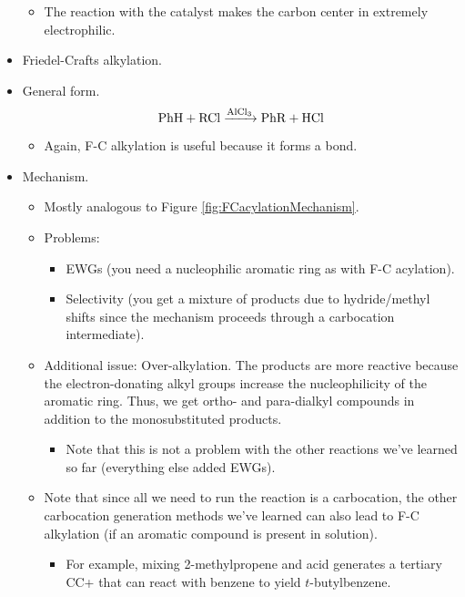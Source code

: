 \documentclass[../notes.tex]{subfiles}
\begin{document}
\begin{itemize}
\begin{itemize}
        \item The reaction with the catalyst makes the carbon center in  extremely electrophilic.
    \end{itemize}
    \item Friedel-Crafts alkylation.
    \item General form.
    \begin{equation*}
        \ce{PhH + RCl ->[AlCl3] PhR + HCl}
    \end{equation*}
    \begin{itemize}
        \item Again, F-C alkylation is useful because it forms a  bond.
    \end{itemize}
    \item Mechanism.
    \begin{itemize}
        \item Mostly analogous to Figure \ref{fig:FCacylationMechanism}.
        \item Problems:
        \begin{itemize}
            \item EWGs (you need a nucleophilic aromatic ring as with F-C acylation).
            \item Selectivity (you get a mixture of products due to hydride/methyl shifts since the mechanism proceeds through a carbocation intermediate).
        \end{itemize}
        \item Additional issue: Over-alkylation. The products are more reactive because the electron-donating alkyl groups increase the nucleophilicity of the aromatic ring. Thus, we get ortho- and para-dialkyl compounds in addition to the monosubstituted products.
        \begin{itemize}
            \item Note that this is not a problem with the other reactions we've learned so far (everything else added EWGs).
        \end{itemize}
        \item Note that since all we need to run the reaction is a carbocation, the other carbocation generation methods we've learned can also lead to F-C alkylation (if an aromatic compound is present in solution).
        \begin{itemize}
            \item For example, mixing 2-methylpropene and acid generates a tertiary CC+ that can react with benzene to yield $t$-butylbenzene.

\end{itemize}
\end{itemize}
\end{itemize}
\end{document}
